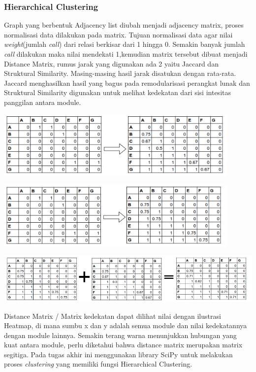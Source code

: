 \subsubsection{Hierarchical Clustering}
Graph yang berbentuk Adjacency list diubah menjadi adjacency matrix, proses normalisasi data dilakukan pada matrix. Tujuan normalisasi data agar nilai \textit{weight}(jumlah \textit{call}) dari relasi berkisar dari 1 hingga 0. Semakin banyak jumlah \textit{call} dilakukan maka nilai mendekati 1,kemudian matrix tersebut dibuat menjadi Distance Matrix, rumus jarak yang digunakan ada 2 yaitu Jaccard dan Struktural Similarity. Masing-masing hasil jarak disatukan dengan rata-rata. Jaccard menghasilkan hasil yang bagus pada remodularisasi perangkat lunak dan Struktural Similarity digunakan untuk melihat kedekatan dari sisi intesitas panggilan antara module.


\begin{center}
	\includegraphics[width=12cm]{img/bab_3/simJaccard.png}
	\label{fig:asd}
\end{center}
\begin{center}
	\includegraphics[width=12cm]{img/bab_3/simStr.png}
	\label{fig:asd}
\end{center}

\begin{center}
	\includegraphics[width=14cm]{img/bab_3/hasilJarak.png}
	\label{fig:asd}
\end{center}
Distance Matrix / Matrix kedekatan dapat dilihat nilai dengan ilustrasi Heatmap, di mana sumbu x dan y adalah semua module dan nilai kedekatannya dengan module lainnya. Semakin terang warna menunjukkan hubungan yang kuat antara module, perlu diketahui bahwa distance matrix merupakan matrix segitiga. Pada tugas akhir ini menggunakan library SciPy untuk melakukan proses \textit{clustering} yang memiliki fungsi Hierarchical Clustering.

